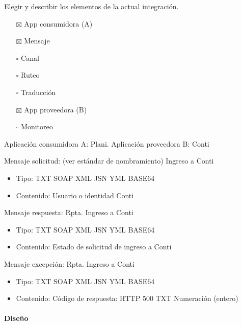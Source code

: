 \documentclass[
  paper=a4,
  ,captions=tableheading
]{scrartcl}
\providecommand{\tightlist}{%
  \setlength{\itemsep}{0pt}\setlength{\parskip}{0pt}}
\begin{document}
Elegir y describir los elementos de la actual integración.

\begin{itemize}
\tightlist
\item[$\boxtimes$]
  App consumidora (A)
\item[$\boxtimes$]
  Mensaje
\item[$\square$]
  Canal
\item[$\square$]
  Ruteo
\item[$\square$]
  Traducción
\item[$\boxtimes$]
  App proveedora (B)
\item[$\square$]
  Monitoreo
\end{itemize}

Aplicación consumidora A: Plani. Aplicación proveedora B: Conti

Mensaje solicitud: (ver estándar de nombramiento) Ingreso a Conti

\begin{itemize}
\tightlist
\item
  Tipo: TXT \textbar{} SOAP \textbar{} XML \textbar{} JSN \textbar{} YML
  \textbar{} BASE64
\item
  Contenido: Usuario o identidad Conti
\end{itemize}

Mensaje respuesta: Rpta. Ingreso a Conti

\begin{itemize}
\tightlist
\item
  Tipo: TXT \textbar{} SOAP \textbar{} XML \textbar{} JSN \textbar{} YML
  \textbar{} BASE64
\item
  Contenido: Estado de solicitud de ingreso a Conti
\end{itemize}

Mensaje excepción: Rpta. Ingreso a Conti

\begin{itemize}
\tightlist
\item
  Tipo: TXT \textbar{} SOAP \textbar{} XML \textbar{} JSN \textbar{} YML
  \textbar{} BASE64
\item
  Contenido: Código de respuesta: HTTP 500 \textbar{} TXT \textbar{}
  Numeración (entero)
\end{itemize}

\paragraph{Diseño}\label{sec:diseuxf1o}
\end{document}
